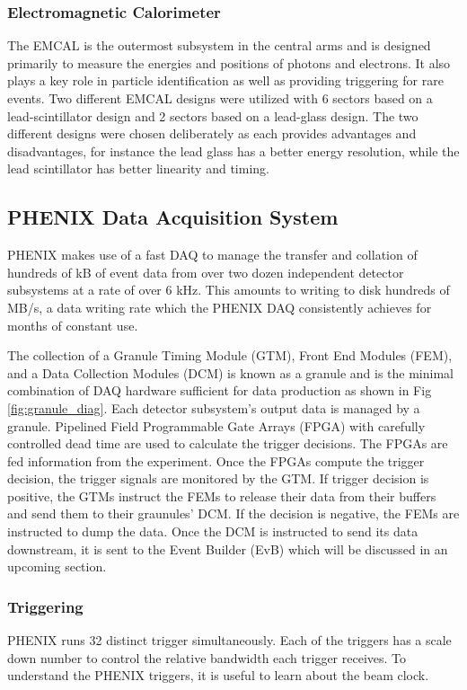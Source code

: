 \subsubsection{Electromagnetic Calorimeter}
The EMCAL is the outermost subsystem in the central arms and is designed primarily to measure the energies and positions of photons and electrons. It also plays a key role in particle identification as well as providing triggering for rare events. Two different EMCAL designs were utilized with 6 sectors based on a lead-scintillator design and 2 sectors based on a lead-glass design. The two different designs were chosen deliberately as each provides advantages and disadvantages, for instance the lead glass has a better energy resolution, while the lead scintillator has better linearity and timing.
\subsection{PHENIX Data Acquisition System}
\label{sec:PHENIX_DAQ}
PHENIX makes use of a fast DAQ to manage the transfer and collation of hundreds of kB of event data from over two dozen independent detector subsystems at a rate of over 6 kHz. This amounts to writing to disk hundreds of MB/s, a data writing rate which the PHENIX DAQ consistently achieves for months of constant use. 

The collection of a  Granule Timing Module (GTM), Front End Modules (FEM), and a Data Collection Modules (DCM) is known as a granule and is the minimal combination of DAQ hardware sufficient for data production as shown in Fig \ref{fig:granule_diag}. Each detector subsystem's output data is managed by a granule. Pipelined Field Programmable Gate Arrays (FPGA) with carefully controlled dead time are used to calculate the trigger decisions. The FPGAs are fed information from the experiment. Once the FPGAs compute the trigger decision, the trigger signals are monitored by the GTM. If trigger decision is positive, the GTMs instruct the FEMs to release their data from their buffers and send them to their graunules' DCM. If the decision is negative, the FEMs are instructed to dump the data.  Once the DCM is instructed to send its data downstream, it is sent to the Event Builder (EvB) which will be discussed in an upcoming section.

\subsubsection{Triggering}
PHENIX runs 32 distinct trigger simultaneously. Each of the triggers has a scale down number to control the relative bandwidth each trigger receives. To understand the PHENIX triggers, it is useful to learn about the beam clock.

